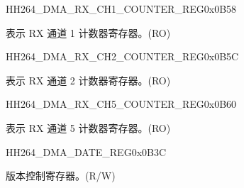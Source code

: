     
    \begin{register}{H}{H264\_DMA\_RX\_CH1\_COUNTER\_REG}{0x0B58}\label{regdesc:H264DMARXCH1COUNTERREG}
    \regnewline%
    \begin{regdesc}\begin{reglist}
    \label{fielddesc:H264DMARXCH1CNT}\item [H264\_DMA\_RX\_CH1\_CNT] 表示 RX 通道 1 计数器寄存器。(RO)
    \end{reglist}\end{regdesc}
    \end{register}
    
    
    \begin{register}{H}{H264\_DMA\_RX\_CH2\_COUNTER\_REG}{0x0B5C}\label{regdesc:H264DMARXCH2COUNTERREG}
    \regnewline%
    \begin{regdesc}\begin{reglist}
    \label{fielddesc:H264DMARXCH2CNT}\item [H264\_DMA\_RX\_CH2\_CNT] 表示 RX 通道 2 计数器寄存器。(RO)
    \end{reglist}\end{regdesc}
    \end{register}
    
    
    \begin{register}{H}{H264\_DMA\_RX\_CH5\_COUNTER\_REG}{0x0B60}\label{regdesc:H264DMARXCH5COUNTERREG}
    \regnewline%
    \begin{regdesc}\begin{reglist}
    \label{fielddesc:H264DMARXCH5CNT}\item [H264\_DMA\_RX\_CH5\_CNT] 表示 RX 通道 5 计数器寄存器。(RO)
    \end{reglist}\end{regdesc}
    \end{register}
    
    \begin{register}{H}{H264\_DMA\_DATE\_REG}{0x0B3C}\label{regdesc:H264DMADATEREG}
    \regnewline%
    \begin{regdesc}\begin{reglist}
    \label{fielddesc:H264DMADATE}\item [H264\_DMA\_DATE] 版本控制寄存器。(R/W)
    \end{reglist}\end{regdesc}
    \end{register}
    